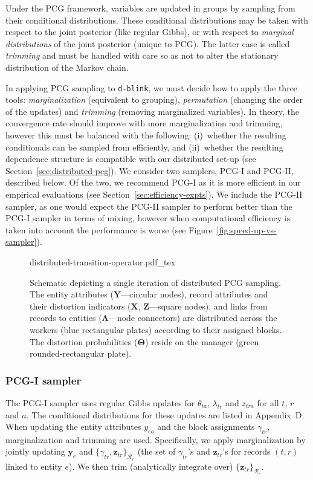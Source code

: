 \documentclass[12pt,letterpaper]{article}
\renewcommand\vec{\bm}
\newcommand{\entset}{\mathcal{R}} %
\newcommand{\1}[1]{\mathbb{I}\!\left[#1\right]} %
\newcommand{\dblink}{\texttt{\upshape \lowercase{d-blink}}} %
\begin{document}
Under the PCG framework, variables are updated in groups by sampling 
from their conditional distributions.
These conditional distributions may be taken with respect to the 
joint posterior (like regular Gibbs), or with respect to 
\emph{marginal distributions} of the joint posterior (unique to PCG).
The latter case is called \emph{trimming} and must be handled with 
care so as not to alter the stationary distribution of the Markov 
chain.

In applying PCG sampling to \dblink, we must decide how to apply the 
three tools: \emph{marginalization} (equivalent to grouping), 
\emph{permutation} (changing the order of the updates) and 
\emph{trimming} (removing marginalized variables).
In theory, the convergence rate should improve with more marginalization and 
trimming, however this must be balanced with the following: 
(i)~whether the resulting conditionals can be sampled from 
efficiently, and 
(ii)~whether the resulting dependence structure is 
compatible with our distributed set-up (see 
Section~\ref{sec:distributed-pcg}).
We consider two samplers, PCG-I and PCG-II, described below.
Of the two, we recommend PCG-I as it is more efficient in our empirical 
evaluations (see Section~\ref{sec:efficiency-expts}).
We include the PCG-II sampler, as one would expect the PCG-II sampler 
to perform better than the PCG-I sampler in terms of mixing, 
however when computational efficiency is taken into account the 
performance is worse (see Figure~\ref{fig:speed-up-vs-sampler}).

\begin{figure*}
  \def\svgwidth{\linewidth}
  {distributed-transition-operator.pdf_tex}
  \caption{Schematic depicting a single iteration of distributed PCG sampling.
    The entity attributes ($\vec{Y}$---circular nodes), record 
    attributes and their distortion indicators ($\vec{X}$, 
    $\vec{Z}$---square nodes), and links from records to entities 
    ($\vec{\Lambda}$---node connectors) are distributed across the 
    workers (blue rectangular plates) according to their assigned 
    blocks.
    The distortion probabilities ($\vec{\Theta}$) reside on the manager 
    (green rounded-rectangular plate).
  }
  \label{fig:distributed-pcg}
\end{figure*}

\subsubsection{PCG-I sampler} 
The PCG-I sampler uses regular Gibbs updates for $\theta_{ta}$, 
$\lambda_{tr}$ and $z_{tra}$ for all $t$, $r$ and $a$.
The conditional distributions for these updates are listed in 
Appendix~D.
When updating the entity attributes $y_{ea}$ and the block 
assignments $\gamma_{tr}$, marginalization and trimming are 
used.
Specifically, we apply marginalization by jointly updating 
$\vec{y}_{e}$ and $\{\gamma_{tr}, \vec{z}_{tr}\}_{\entset_{e}}$ 
(the set of $\gamma_{tr}$'s and $\vec{z}_{tr}$'s for records $(t,r)$ 
linked to entity $e$).
We then trim (analytically integrate over) 
$\{\vec{z}_{tr}\}_{\entset_{e}}$.
\end{document}
